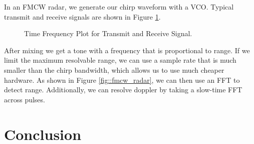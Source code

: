 \documentclass{article}
\begin{document}
\noindent In an FMCW radar, we generate our chirp waveform with a VCO.  Typical transmit and receive signals are shown in Figure \ref{fig::fmcw_spectrogram}.

\begin{figure}[H]
    	\centering
    	\caption{Time Frequency Plot for Transmit and Receive Signal.\cite{Long2019AssistingTV}}
    	\label{fig::fmcw_spectrogram}
\end{figure}

\noindent After mixing we get a tone with a frequency that is proportional to range. If we limit the maximum resolvable range, we can use a sample rate that is much smaller than the chirp bandwidth, which allows us to use much cheaper hardware. As shown in Figure \ref{fig::fmcw_radar}, we can then use an FFT to detect range. Additionally, we can resolve doppler by taking a slow-time FFT across pulses.

\section{Conclusion}


{}
\end{document}
